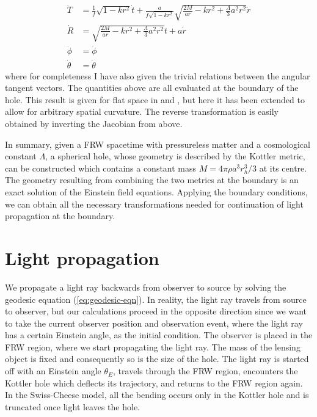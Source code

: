 \begin{subequations}
  \begin{align}
    \dot{T} &= \frac{1}{f}\sqrt{1-kr^2} \dot{t} + \frac{a}{f\sqrt{1-kr^2}} \sqrt{\frac{2M}{ar} - kr^2 + \frac{\Lambda}{3}a^2 r^2} \dot{r} \\
    \dot{R} &= \sqrt{\frac{2M}{ar} - kr^2 + \frac{\Lambda}{3}a^2 r^2} \dot{t} + a\dot{r}\\
    \dot{\phi} &= \dot{\phi}\\
    \dot{\theta} &= \dot{\theta}
  \end{align}
  \label{eq:kottler-to-frw-transform-jacobian}
\end{subequations}
where for completeness I have also given the trivial relations between the angular tangent vectors. The quantities above are all evaluated at the boundary of the hole. This result is given for flat space in \citet{schucker2009strong} and \citet{fleury2013interpretation}, but here it has been extended to allow for arbitrary spatial curvature. The reverse transformation is easily obtained by inverting the Jacobian from above. 

In summary, given a FRW spacetime with pressureless matter and a cosmological constant $\Lambda$, a spherical hole, whose geometry is described by the Kottler metric, can be constructed which contains a constant mass $M = 4\pi \rho a^3 r_h^3/3$ at its centre. The geometry resulting from combining the two metrics at the boundary is an exact solution of the Einstein field equations. Applying the boundary conditions, we can obtain all the necessary transformations needed for continuation of light propagation at the boundary. 

\section{Light propagation}

We propagate a light ray backwards from observer to source by solving the geodesic equation (\autoref{eq:geodesic-eqn}). In reality, the light ray travels from source to observer, but our calculations proceed in the opposite direction since we want to take the current observer position and observation event, where the light ray has a certain Einstein angle, as the initial condition. The observer is placed in the FRW region, where we start propagating the light ray. The mass of the lensing object is fixed and consequently so is the size of the hole. The light ray is started off with an Einstein angle $\theta_{E}$, travels through the FRW region, encounters the Kottler hole which deflects its trajectory, and returns to the FRW region again. In the Swiss-Cheese model, all the bending occurs only in the Kottler hole and is truncated once light leaves the hole. 

